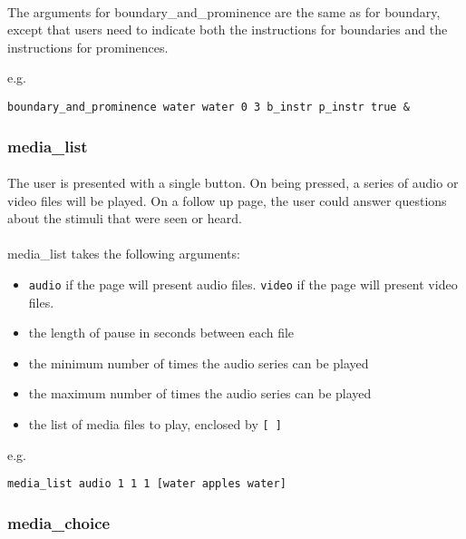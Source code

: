 \paragraph{}
The arguments for boundary\_and\_prominence are the same as for boundary, except that users need to indicate both the instructions for boundaries and the instructions for prominences.

e.g.
\begin{lstlisting}
boundary_and_prominence water water 0 3 b_instr p_instr true &
\end{lstlisting}

\subsubsection{media\_list}

\paragraph{}
The user is presented with a single button.  On being pressed, a series of audio or video files will be played.  On a follow up page, the user could answer questions about the stimuli that were seen or heard.

\paragraph{}
media\_list takes the following arguments:

\begin{itemize}
\item \texttt{audio} if the page will present audio files.  \texttt{video} if the page will present video files.
\item the length of pause in seconds between each file
\item the minimum number of times the audio series can be played
\item the maximum number of times the audio series can be played
\item the list of media files to play, enclosed by \texttt{[ ]}
\end{itemize}

e.g.
\begin{lstlisting}
media_list audio 1 1 1 [water apples water]
\end{lstlisting}

\subsubsection{media\_choice}

